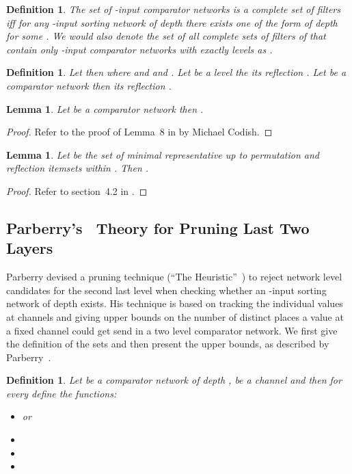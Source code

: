 \documentclass[13pt,a4paper]{article}
\newtheorem{lemma}[theorem]{Lemma}
\newtheorem{definition}[theorem]{Definition}
\begin{document}
\begin{definition}
\label{def:filters}
The set  of -input comparator networks is a complete set of filters iff for any -input sorting network of depth  there exists one of the form  of depth  for some . We would also denote the set of all complete sets of filters of that contain only -input comparator networks with exactly  levels as  .
\end{definition}


\begin{definition}
\label{def:network:reflect}
Let  then  where  and  and .
Let  be a level the its reflection .
Let  be a comparator network then its reflection .
\end{definition}

\begin{lemma}
\label{lemma:network:reflect}
Let  be a comparator network then .
\end{lemma}

\begin{proof}
Refer to the proof of Lemma~8 in \cite{BundalaCCSZ14_Optimal_Depth} by Michael Codish.
\end{proof}

\begin{lemma}
\label{lemma:reflect}
Let  be the set of minimal representative up to permutation and reflection itemsets within . Then .
\end{lemma}

\begin{proof}
Refer to section~4.2 in \cite{BundalaCCSZ14_Optimal_Depth}.
\end{proof}

\subsection{Parberry's~\cite{Parberry89} Theory for Pruning Last Two Layers}

Parberry devised a pruning technique (``The Heuristic''~\cite{Parberry89}) to reject network level candidates for the second last level when checking whether an -input sorting network of depth  exists. His technique is based on tracking the individual values at channels and giving upper bounds on the number of distinct places a value at a fixed channel  could get send in a two level comparator network. We first give the definition of the sets and then present the upper bounds, as described by Parberry~\cite{Parberry89}. 

\begin{definition}
\label{def:connect}
Let  be a comparator network of depth ,  be a channel and  then for every  define the functions:
\begin{itemize}
\item     or 
\item 
\item 
\item 
\end{itemize}
\end{definition}
\end{document}
